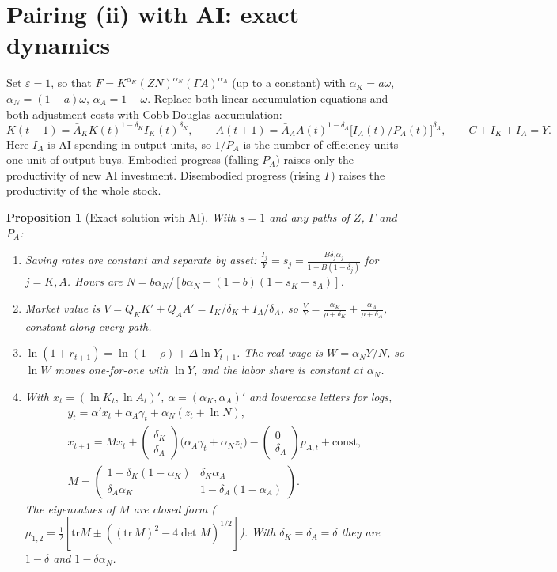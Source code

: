 \documentclass[11pt]{article}
\newtheorem{proposition}{Proposition}
\newcommand{\e}{\varepsilon}
\begin{document}
\section{Pairing (ii) with AI: exact dynamics}\label{sec:cdcd}

Set $\e=1$, so that $F=K^{\alpha_K}(ZN)^{\alpha_N}(\Gamma A)^{\alpha_A}$ (up to a constant) with
$\alpha_K=a\omega$, $\alpha_N=(1-a)\omega$, $\alpha_A=1-\omega$. Replace both linear
accumulation equations and both adjustment costs with Cobb-Douglas accumulation:
\begin{equation}
K(t+1)=\bar A_K K(t)^{1-\delta_K}I_K(t)^{\delta_K},\qquad
A(t+1)=\bar A_A A(t)^{1-\delta_A}\big[I_A(t)/P_A(t)\big]^{\delta_A},\qquad
C+I_K+I_A=Y .
\label{eq:cdcdAI}
\end{equation}
Here $I_A$ is AI spending in output units, so $1/P_A$ is the number of efficiency units
one unit of output buys. Embodied progress (falling $P_A$) raises only the
productivity of new AI investment. Disembodied progress (rising $\Gamma$) raises the
productivity of the whole stock.

\begin{proposition}[Exact solution with AI]\label{prop:cdcdAI}
With $s=1$ and any paths of $Z$, $\Gamma$ and $P_A$:
\begin{enumerate}
\item Saving rates are constant and separate by asset:
$\displaystyle \frac{I_j}{Y}=s_j=\frac{B\delta_j\alpha_j}{1-B(1-\delta_j)}$ for $j=K,A$.
Hours are $N=b\alpha_N/[b\alpha_N+(1-b)(1-s_K-s_A)]$.
\item Market value is $V=Q_KK'+Q_AA'=I_K/\delta_K+I_A/\delta_A$, so
$\displaystyle\frac VY=\frac{\alpha_K}{\rho+\delta_K}+\frac{\alpha_A}{\rho+\delta_A}$,
constant along every path.
\item $\ln(1+r_{t+1})=\ln(1+\rho)+\Delta\ln Y_{t+1}$. The real wage is $W=\alpha_NY/N$, so
$\ln W$ moves one-for-one with $\ln Y$, and the labor share is constant at $\alpha_N$.
\item With $x_t=(\ln K_t,\ln A_t)'$, $\alpha=(\alpha_K,\alpha_A)'$ and lowercase letters for logs,
\begin{gather*}
y_t=\alpha'x_t+\alpha_A\gamma_t+\alpha_N(z_t+\ln N),\\
x_{t+1}=Mx_t+\begin{pmatrix}\delta_K\\ \delta_A\end{pmatrix}\big(\alpha_A\gamma_t+\alpha_Nz_t\big)
-\begin{pmatrix}0\\ \delta_A\end{pmatrix}p_{A,t}+\text{const},\\
M=\begin{pmatrix}1-\delta_K(1-\alpha_K)&\delta_K\alpha_A\\ \delta_A\alpha_K&1-\delta_A(1-\alpha_A)\end{pmatrix}.
\end{gather*}
The eigenvalues of $M$ are closed form ($\mu_{1,2}=\tfrac12[\mathrm{tr}M\pm((\mathrm{tr}\,M)^2-4\det M)^{1/2}]$).
With $\delta_K=\delta_A=\delta$ they are $1-\delta$ and $1-\delta\alpha_N$.
\end{enumerate}
\end{proposition}
\end{document}
